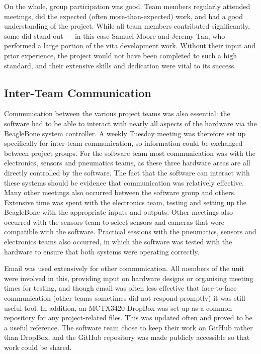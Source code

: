 On the whole, group participation was good. Team members regularly attended meetings, did the expected (often more-than-expected) work, and had a good understanding of the project. While all team members contributed significantly, some did stand out --- in this case Samuel Moore and Jeremy Tan, who performed a large portion of the vita development work. Without their input and prior experience, the project would not have been completed to such a high standard, and their extensive skills and dedication were vital to its success.

\subsection{Inter-Team Communication}

Communication between the various project teams was also essential: the software had to be able to interact with nearly all aspects of the hardware via the BeagleBone system controller.  A weekly Tuesday meeting was therefore set up specifically for inter-team communication, so information could be exchanged between project groups. For the software team most communication was with the electronics, sensors and pneumatics teams, as these three hardware areas are all directly controlled by the software. The fact that the software can interact with these systems should be evidence that communication was relatively effective.
Many other meetings also occurred between the software group and others. Extensive time was spent with the electronics team, testing and setting up the BeagleBone with the appropriate inputs and outputs. Other meetings also occurred with the sensors team to select sensors and cameras that were compatible with the software. Practical sessions with the pneumatics, sensors and electronics teams also occurred, in which the software was tested with the hardware to ensure that both systems were operating correctly.


Email was used extensively for other communication. All members of the unit were involved in this, providing input on hardware designs or organising meeting times for testing, and though email was often less effective that face-to-face communication (other teams sometimes did not respond promptly) it was still useful tool. In addition, an MCTX3420 DropBox was set up as a common repository for any project-related files. This was updated often and proved to be a useful reference. The software team chose to keep their work on GitHub rather than DropBox, and the GitHub repository was made publicly accessible so that work could be shared.

